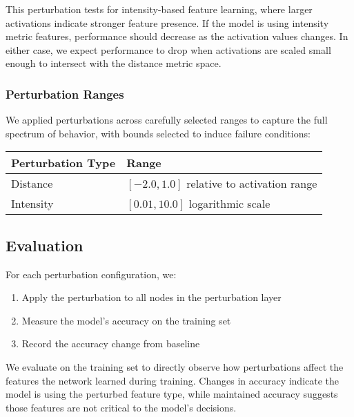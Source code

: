 This perturbation tests for intensity-based feature learning, where larger activations indicate stronger feature presence. If the model is using intensity metric features, performance should decrease as the activation values changes. In either case, we expect performance to drop when activations are scaled small enough to intersect with the distance metric space.

\subsubsection{Perturbation Ranges}
We applied perturbations across carefully selected ranges to capture the full spectrum of behavior, with bounds selected to induce failure conditions:

\begin{table}[h]
\centering
\begin{tabular}{ll}
\hline
\textbf{Perturbation Type} & \textbf{Range} \\
\hline
Distance & $[-2.0, 1.0]$ relative to activation range \\
Intensity & $[0.01, 10.0]$ logarithmic scale \\
\hline
\end{tabular}
\end{table}


\subsection{Evaluation}
For each perturbation configuration, we:
\begin{enumerate}
    \item Apply the perturbation to all nodes in the perturbation layer
    \item Measure the model's accuracy on the training set
    \item Record the accuracy change from baseline
\end{enumerate}

We evaluate on the training set to directly observe how perturbations affect the features the network learned during training. Changes in accuracy indicate the model is using the perturbed feature type, while maintained accuracy suggests those features are not critical to the model's decisions.